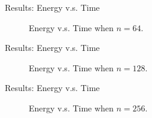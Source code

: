 \documentclass[10pt, xcolor = svgnames, aspectratio=43]{beamer} %
\begin{document}
\begin{frame}{Results: Energy v.s. Time}
\begin{figure}
\caption{Energy v.s. Time when $n = 64$.}
\label{E-T64}
\end{figure}
\end{frame}


\begin{frame}{Results: Energy v.s. Time}
\begin{figure}
\caption{Energy v.s. Time when $n = 128$.}
\label{E-T128}
\end{figure}
\end{frame}


\begin{frame}{Results: Energy v.s. Time}
\begin{figure}
\caption{Energy v.s. Time when $n = 256$.}
\label{E-T256}
\end{figure}
\end{frame}
\end{document}
